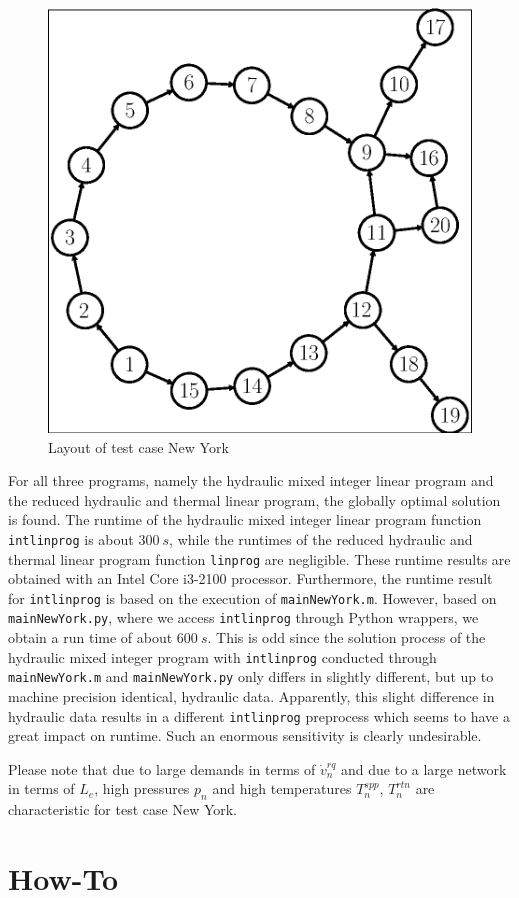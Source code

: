 \documentclass[a4paper,10pt]{article}
\begin{document}
\begin{figure}
  \centering
  \includegraphics[width=.6\textwidth]{Fig/layout}
  \caption{Layout of test case New York}\label{fig:2}
\end{figure}

For all three programs, namely the hydraulic mixed integer linear program and the reduced hydraulic and thermal linear program, the globally optimal solution is found.
The runtime of the hydraulic mixed integer linear program function \texttt{intlinprog} is about $300\ \si{s}$, while the runtimes of the reduced hydraulic and thermal linear program function \texttt{linprog} are negligible.
These runtime results are obtained with an Intel Core i3-2100 processor.
Furthermore, the runtime result for \texttt{intlinprog} is based on the execution of \texttt{mainNewYork.m}.
However, based on \texttt{mainNewYork.py}, where we access \texttt{intlinprog} through Python wrappers, we obtain a run time of about $600\ \si{s}$.
This is odd since the solution process of the hydraulic mixed integer program with \texttt{intlinprog} conducted through \texttt{mainNewYork.m} and \texttt{mainNewYork.py} only differs in slightly different, but up to machine precision identical, hydraulic data.
Apparently, this slight difference in hydraulic data results in a different \texttt{intlinprog} preprocess which seems to have a great impact on runtime.
Such an enormous sensitivity is clearly undesirable.

Please note that due to large demands in terms of $\dot{v}_n^{rq}$ and due to a large network in terms of $L_e$, high pressures $p_n$ and high temperatures $T_n^{spp}$, $T_n^{rtn}$ are characteristic for test case New York.

\section{How-To}
\end{document}
